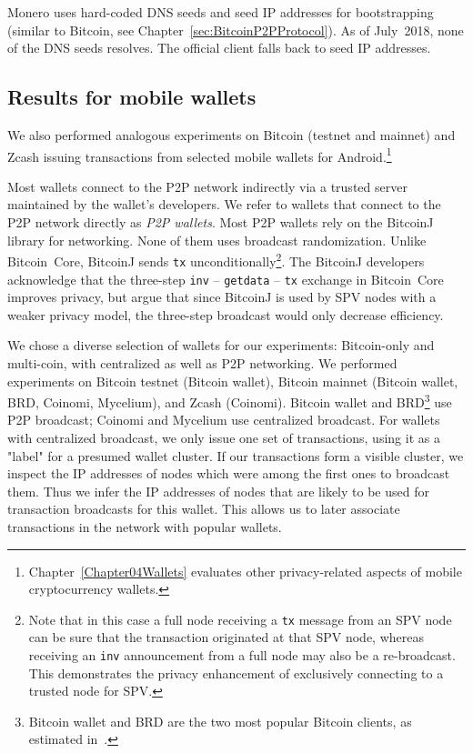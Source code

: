 Monero uses hard-coded DNS seeds and seed IP addresses for bootstrapping (similar to Bitcoin, see Chapter~\ref{sec:BitcoinP2PProtocol}).
As of July~2018, none of the DNS seeds resolves.
The official client falls back to seed IP addresses.


\subsection{Results for mobile wallets}

We also performed analogous experiments on Bitcoin (testnet and mainnet) and Zcash issuing transactions from selected mobile wallets for Android.\footnote{Chapter~\ref{Chapter04Wallets} evaluates other privacy-related aspects of mobile cryptocurrency wallets.}

Most wallets connect to the P2P network indirectly via a trusted server maintained by the wallet's developers.
We refer to wallets that connect to the P2P network directly as \textit{P2P wallets}.
Most P2P wallets rely on the BitcoinJ library for networking.
None of them uses broadcast randomization.
Unlike Bitcoin~Core, BitcoinJ sends \texttt{tx} unconditionally\footnote{Note that in this case a full node receiving a \texttt{tx} message from an SPV node can be sure that the transaction originated at that SPV node, whereas receiving an \texttt{inv} announcement from a full node may also be a re-broadcast. This demonstrates the privacy enhancement of exclusively connecting to a trusted node for SPV.}.
The BitcoinJ developers acknowledge that the three-step \texttt{inv} -- \texttt{getdata} -- \texttt{tx} exchange in Bitcoin~Core improves privacy, but argue that since BitcoinJ is used by SPV nodes with a weaker privacy model, the three-step broadcast would only decrease efficiency.

We chose a diverse selection of wallets for our experiments: Bitcoin-only and multi-coin, with centralized as well as P2P networking.
We performed experiments on Bitcoin testnet (Bitcoin wallet), Bitcoin mainnet (Bitcoin wallet, BRD, Coinomi, Mycelium), and Zcash (Coinomi).
Bitcoin wallet and BRD\footnote{Bitcoin wallet and BRD are the two most popular Bitcoin clients, as estimated in~\cite{Wang2017}.} use P2P broadcast; Coinomi and Mycelium use centralized broadcast.
For wallets with centralized broadcast, we only issue one set of transactions, using it as a "label" for a presumed wallet cluster.
If our transactions form a visible cluster, we inspect the IP addresses of nodes which were among the first ones to broadcast them.
Thus we infer the IP addresses of nodes that are likely to be used for transaction broadcasts for this wallet.
This allows us to later associate transactions in the network with popular wallets.

